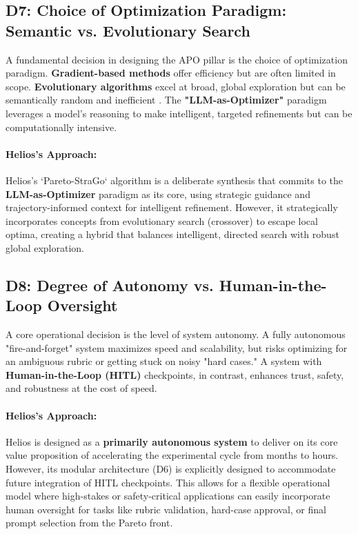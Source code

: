 \documentclass{article}
\begin{document}
\subsection*{D7: Choice of Optimization Paradigm: Semantic vs. Evolutionary Search}
A fundamental decision in designing the APO pillar is the choice of optimization paradigm. \textbf{Gradient-based methods} offer efficiency but are often limited in scope. \textbf{Evolutionary algorithms} excel at broad, global exploration but can be semantically random and inefficient \citep{cui2024phaseevounifiedincontextprompt}. The \textbf{"LLM-as-Optimizer"} paradigm leverages a model's reasoning to make intelligent, targeted refinements but can be computationally intensive.

\paragraph{Helios's Approach:} Helios's `Pareto-StraGo` algorithm is a deliberate synthesis that commits to the \textbf{LLM-as-Optimizer} paradigm as its core, using strategic guidance \citep{wu2024stragoharnessingstrategicguidance} and trajectory-informed context \citep{yang2024largelanguagemodelsoptimizers} for intelligent refinement. However, it strategically incorporates concepts from evolutionary search (crossover) to escape local optima, creating a hybrid that balances intelligent, directed search with robust global exploration.

\subsection*{D8: Degree of Autonomy vs. Human-in-the-Loop Oversight}
A core operational decision is the level of system autonomy. A fully autonomous "fire-and-forget" system maximizes speed and scalability, but risks optimizing for an ambiguous rubric or getting stuck on noisy "hard cases." A system with \textbf{Human-in-the-Loop (HITL)} checkpoints, in contrast, enhances trust, safety, and robustness at the cost of speed.

\paragraph{Helios's Approach:} Helios is designed as a \textbf{primarily autonomous system} to deliver on its core value proposition of accelerating the experimental cycle from months to hours. However, its modular architecture (D6) is explicitly designed to accommodate future integration of HITL checkpoints. This allows for a flexible operational model where high-stakes or safety-critical applications can easily incorporate human oversight for tasks like rubric validation, hard-case approval, or final prompt selection from the Pareto front.
\end{document}
